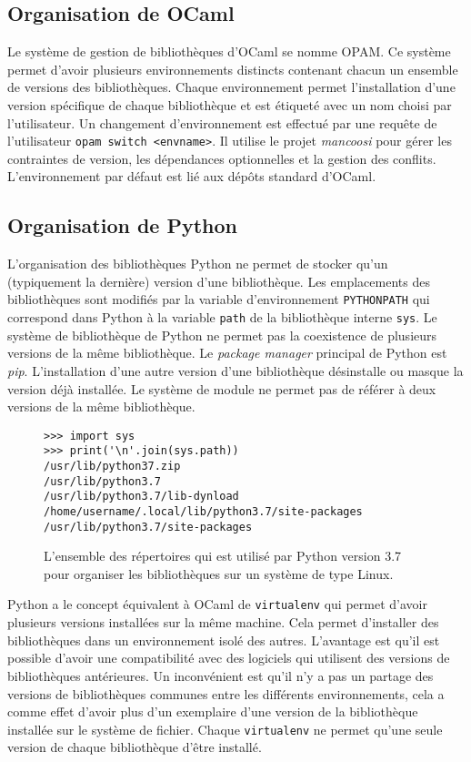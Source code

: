 \subsection{Organisation de OCaml}
%
Le système de gestion de bibliothèques d'OCaml se nomme OPAM. Ce système permet
d'avoir plusieurs environnements distincts contenant chacun un ensemble de
versions des bibliothèques.  Chaque environnement permet l'installation d'une
version spécifique de chaque bibliothèque et est étiqueté avec un nom choisi
par l'utilisateur. Un changement d'environnement est effectué par une requête
de l'utilisateur \verb|opam switch <envname>|. Il utilise le projet
\textit{mancoosi} pour gérer les contraintes de
version, les dépendances optionnelles et la gestion des conflits.
L'environnement par défaut est lié aux dépôts standard d'OCaml.

\subsection{Organisation de Python}
%
L'organisation des bibliothèques Python ne permet de stocker qu'un (typiquement la dernière)
version d'une bibliothèque. Les emplacements des bibliothèques sont modifiés
par la variable d'environnement \verb|PYTHONPATH| qui correspond dans Python à
la variable \verb|path| de la bibliothèque interne \verb|sys|. Le système de
bibliothèque de Python ne permet pas la coexistence de plusieurs versions de la
même bibliothèque. Le \textit{package manager} principal de Python est
\textit{pip}.  L'installation d'une autre version d'une bibliothèque
désinstalle ou masque la version déjà installée. Le système de module ne permet
pas de référer à deux versions de la même bibliothèque.

\begin{figure}[ht]
    \fontsize{12}{10}
    \begin{minipage}[ht]{0.5\textwidth}
\begin{verbatim}
>>> import sys
>>> print('\n'.join(sys.path))
/usr/lib/python37.zip
/usr/lib/python3.7
/usr/lib/python3.7/lib-dynload
/home/username/.local/lib/python3.7/site-packages
/usr/lib/python3.7/site-packages
\end{verbatim}
    \end{minipage}
    \caption{L'ensemble des répertoires qui est utilisé par Python version 3.7
    pour organiser les bibliothèques sur un système de type Linux.}
\end{figure}

Python a le concept équivalent à OCaml de \texttt{virtualenv} qui permet
d'avoir plusieurs versions installées sur la même machine. Cela permet
d'installer des bibliothèques dans un environnement isolé des autres.
L'avantage est qu'il est possible d'avoir une compatibilité avec des logiciels
qui utilisent des versions de bibliothèques antérieures. Un inconvénient est
qu'il n'y a pas un partage des versions de bibliothèques communes entre les
différents environnements, cela a comme effet d'avoir plus d'un exemplaire d'une
version de la bibliothèque installée sur le système de fichier. Chaque
\texttt{virtualenv} ne permet qu'une seule version de chaque bibliothèque
d'être installé.

